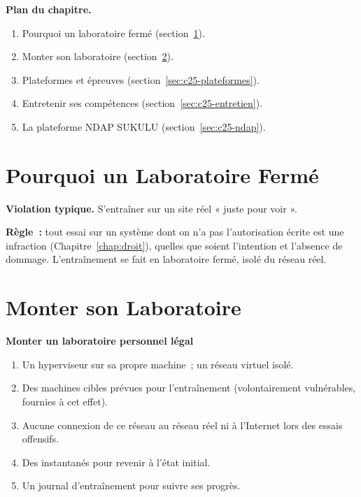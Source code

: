 \medskip
\textbf{Plan du chapitre.}
\begin{enumerate}
    \item Pourquoi un laboratoire fermé (section~\ref{sec:c25-pourquoi}).
    \item Monter son laboratoire (section~\ref{sec:c25-monter}).
    \item Plateformes et épreuves (section~\ref{sec:c25-plateformes}).
    \item Entretenir ses compétences (section~\ref{sec:c25-entretien}).
    \item La plateforme NDAP SUKULU (section~\ref{sec:c25-ndap}).
\end{enumerate}

\separateur

\section{Pourquoi un Laboratoire Fermé}
\label{sec:c25-pourquoi}

\begin{boxalert}
\textbf{Violation typique.} S'entraîner sur un site réel « juste pour voir ».

\smallskip
\textbf{Règle~:} tout essai sur un système dont on n'a pas l'autorisation
écrite est une infraction (Chapitre~\ref{chap:droit}), quelles que soient
l'intention et l'absence de dommage. L'entraînement se fait en laboratoire
fermé, isolé du réseau réel.
\end{boxalert}

\section{Monter son Laboratoire}
\label{sec:c25-monter}

\begin{boxprocedure}
\textbf{Monter un laboratoire personnel légal}
\begin{enumerate}
    \item Un hyperviseur sur sa propre machine~; un réseau virtuel isolé.
    \item Des machines cibles prévues pour l'entraînement (volontairement
          vulnérables, fournies à cet effet).
    \item Aucune connexion de ce réseau au réseau réel ni à l'Internet lors
          des essais offensifs.
    \item Des instantanés pour revenir à l'état initial.
    \item Un journal d'entraînement pour suivre ses progrès.
\end{enumerate}
\end{boxprocedure}

